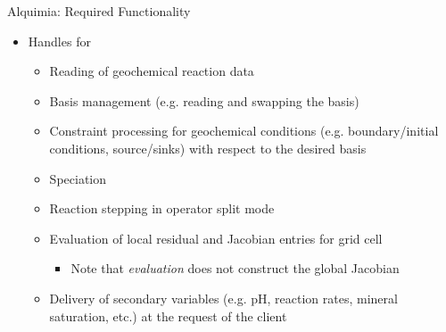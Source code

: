 \documentclass{beamer}
\begin{document}
\begin{frame}{Alquimia: Required Functionality}
\begin{itemize}
\item Handles for
\begin{itemize}
\item Reading of geochemical reaction data
\item Basis management (e.g. reading and swapping the basis)
\item Constraint processing for geochemical conditions (e.g. boundary/initial conditions, source/sinks) with respect to the desired basis
\item Speciation
\item Reaction stepping in operator split mode
\item Evaluation of local residual and Jacobian entries for grid cell
\begin{itemize}
\item Note that \emph{evaluation} does not construct the global Jacobian
\end{itemize}
\item Delivery of secondary variables (e.g. pH, reaction rates, mineral saturation, etc.) at the request of the client
\end{itemize}
\end{itemize}
\end{frame}
\end{document}
